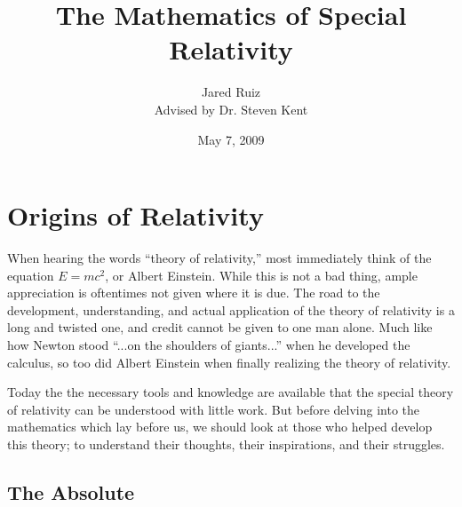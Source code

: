 \documentclass[12pt]{article}
\theoremstyle{defn}
\theoremstyle{pf}
\newcommand{\0}{\emptyset}
\renewcommand{\-}{\setminus}
\begin{document}
\title{The Mathematics of Special Relativity}
\author{Jared Ruiz\\Advised by Dr. Steven Kent}

\date{May 7, 2009}


\maketitle

\newpage


\section{Origins of Relativity}

When hearing the words ``theory of relativity,'' most immediately
think of the equation $E=mc^2$, or Albert Einstein. While this is
not a bad thing, ample appreciation is oftentimes not given where it is
due. The road to the development, understanding, and actual
application of the theory of relativity is a long and twisted one,
and credit cannot be given to one man alone. Much like how Newton
stood ``...on the shoulders of giants...'' when he developed the
calculus, so too did Albert Einstein when finally realizing the
theory of relativity. 

Today the the necessary tools and knowledge are available that the special theory of relativity can be understood with little work. But before delving into the mathematics which lay before us, we should look at those who helped develop this theory; to understand their thoughts, their inspirations, and their struggles.

\subsection{The Absolute}
\end{document}
